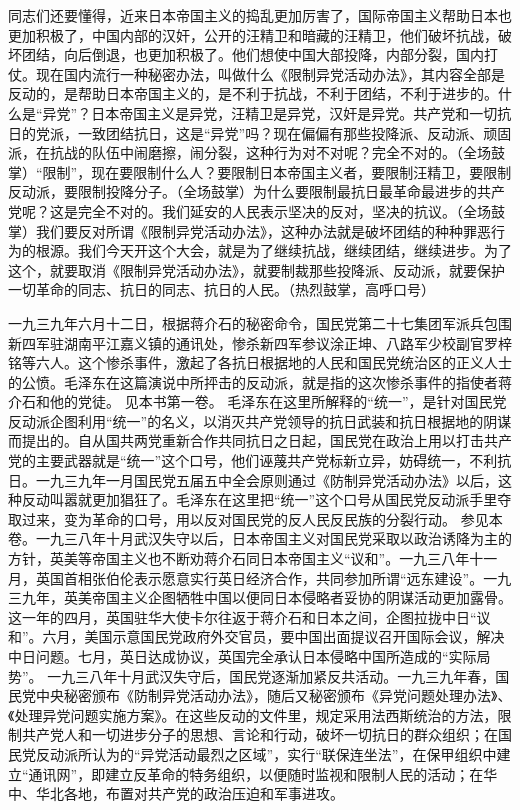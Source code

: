 同志们还要懂得，近来日本帝国主义的捣乱更加厉害了，国际帝国主义帮助日本也更加积极了，中国内部的汉奸，公开的汪精卫和暗藏的汪精卫，他们破坏抗战，破坏团结，向后倒退，也更加积极了。他们想使中国大部投降，内部分裂，国内打仗。现在国内流行一种秘密办法，叫做什么《限制异党活动办法》，其内容全部是反动的，是帮助日本帝国主义的，是不利于抗战，不利于团结，不利于进步的。什么是“异党”？日本帝国主义是异党，汪精卫是异党，汉奸是异党。共产党和一切抗日的党派，一致团结抗日，这是“异党”吗？现在偏偏有那些投降派、反动派、顽固派，在抗战的队伍中闹磨擦，闹分裂，这种行为对不对呢？完全不对的。（全场鼓掌）“限制”，现在要限制什么人？要限制日本帝国主义者，要限制汪精卫，要限制反动派，要限制投降分子。（全场鼓掌）为什么要限制最抗日最革命最进步的共产党呢？这是完全不对的。我们延安的人民表示坚决的反对，坚决的抗议。（全场鼓掌）我们要反对所谓《限制异党活动办法》，这种办法就是破坏团结的种种罪恶行为的根源。我们今天开这个大会，就是为了继续抗战，继续团结，继续进步。为了这个，就要取消《限制异党活动办法》，就要制裁那些投降派、反动派，就要保护一切革命的同志、抗日的同志、抗日的人民。（热烈鼓掌，高呼口号）


\begin{maonote}
一九三九年六月十二日，根据蒋介石的秘密命令，国民党第二十七集团军派兵包围新四军驻湖南平江嘉义镇的通讯处，惨杀新四军参议涂正坤、八路军少校副官罗梓铭等六人。这个惨杀事件，激起了各抗日根据地的人民和国民党统治区的正义人士的公愤。毛泽东在这篇演说中所抨击的反动派，就是指的这次惨杀事件的指使者蒋介石和他的党徒。
见本书第一卷。
毛泽东在这里所解释的“统一”，是针对国民党反动派企图利用“统一”的名义，以消灭共产党领导的抗日武装和抗日根据地的阴谋而提出的。自从国共两党重新合作共同抗日之日起，国民党在政治上用以打击共产党的主要武器就是“统一”这个口号，他们诬蔑共产党标新立异，妨碍统一，不利抗日。一九三九年一月国民党五届五中全会原则通过《防制异党活动办法》以后，这种反动叫嚣就更加猖狂了。毛泽东在这里把“统一”这个口号从国民党反动派手里夺取过来，变为革命的口号，用以反对国民党的反人民反民族的分裂行动。
参见本卷。一九三八年十月武汉失守以后，日本帝国主义对国民党采取以政治诱降为主的方针，英美等帝国主义也不断劝蒋介石同日本帝国主义“议和”。一九三八年十一月，英国首相张伯伦表示愿意实行英日经济合作，共同参加所谓“远东建设”。一九三九年，英美帝国主义企图牺牲中国以便同日本侵略者妥协的阴谋活动更加露骨。这一年的四月，英国驻华大使卡尔往返于蒋介石和日本之间，企图拉拢中日“议和”。六月，美国示意国民党政府外交官员，要中国出面提议召开国际会议，解决中日问题。七月，英日达成协议，英国完全承认日本侵略中国所造成的“实际局势”。
一九三八年十月武汉失守后，国民党逐渐加紧反共活动。一九三九年春，国民党中央秘密颁布《防制异党活动办法》，随后又秘密颁布《异党问题处理办法》、《处理异党问题实施方案》。在这些反动的文件里，规定采用法西斯统治的方法，限制共产党人和一切进步分子的思想、言论和行动，破坏一切抗日的群众组织；在国民党反动派所认为的“异党活动最烈之区域”，实行“联保连坐法”，在保甲组织中建立“通讯网”，即建立反革命的特务组织，以便随时监视和限制人民的活动；在华中、华北各地，布置对共产党的政治压迫和军事进攻。
\end{maonote}
